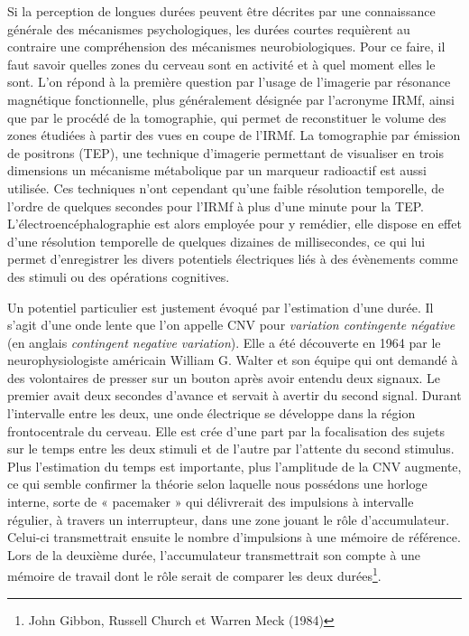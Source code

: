 \documentclass[12pt,fleqn,oneside,openany]{book} %
\begin{document}
Si la perception de longues durées peuvent être décrites par une connaissance générale des mécanismes psychologiques, les durées courtes requièrent au contraire une compréhension des mécanismes neurobiologiques. Pour ce faire, il faut savoir quelles zones du cerveau sont en activité et à quel moment elles le sont. L'on répond à la première question par l'usage de l'imagerie par résonance magnétique fonctionnelle, plus généralement désignée par l'acronyme IRMf, ainsi que par le procédé de la tomographie, qui permet de reconstituer le volume des zones étudiées à partir des vues en coupe de l'IRMf. La tomographie par émission de positrons (TEP), une technique d'imagerie permettant de visualiser en trois dimensions un mécanisme métabolique par un marqueur radioactif est aussi utilisée. Ces techniques n'ont cependant qu'une faible résolution temporelle, de l'ordre de quelques secondes pour l'IRMf à plus d'une minute pour la TEP. L'électroencéphalographie est alors employée pour y remédier, elle dispose en effet d'une résolution temporelle de quelques dizaines de millisecondes, ce qui lui permet d'enregistrer les divers potentiels électriques liés à des évènements comme des stimuli ou des opérations cognitives. 

Un potentiel particulier est justement évoqué par l'estimation d'une durée. Il s'agit d'une onde lente que l'on appelle CNV pour \emph{variation contingente négative} (en anglais \emph{contingent negative variation}). Elle a été découverte en 1964 par le neurophysiologiste américain William G. Walter et son équipe qui ont demandé à des volontaires de presser sur un bouton après avoir entendu deux signaux. Le premier avait deux secondes d'avance et servait à avertir du second signal. Durant l'intervalle entre les deux, une onde électrique se développe dans la région frontocentrale du cerveau. Elle est crée d'une part par la focalisation des sujets sur le temps entre les deux stimuli et de l'autre par l'attente du second stimulus. Plus l'estimation du temps est importante, plus l'amplitude de la CNV augmente, ce qui semble confirmer la théorie selon laquelle nous possédons une horloge interne, sorte de « pacemaker » qui délivrerait des impulsions à intervalle régulier, à travers un interrupteur, dans une zone jouant le rôle d'accumulateur. Celui-ci transmettrait ensuite le nombre d'impulsions à une mémoire de référence. Lors de la deuxième durée, l'accumulateur transmettrait son compte à une mémoire de travail dont le rôle serait de comparer les deux durées\footnote{John Gibbon, Russell Church et Warren Meck (1984)}.
\end{document}
